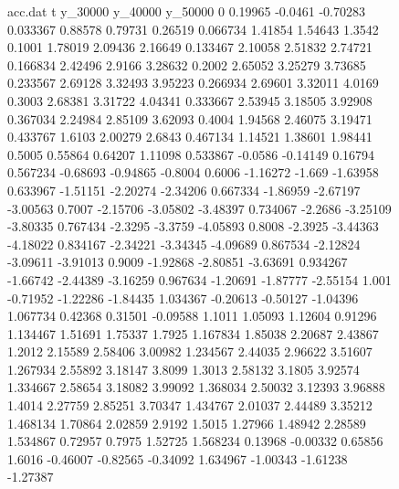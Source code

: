 \begin{figure}[H]
    \centering
        \begin{filecontents}{acc.dat}
                t	y_30000	y_40000	y_50000
                0	0.19965	-0.0461	-0.70283
                0.033367	0.88578	0.79731	0.26519
                0.066734	1.41854	1.54643	1.3542
                0.1001	1.78019	2.09436	2.16649
                0.133467	2.10058	2.51832	2.74721
                0.166834	2.42496	2.9166	3.28632
                0.2002	2.65052	3.25279	3.73685
                0.233567	2.69128	3.32493	3.95223
                0.266934	2.69601	3.32011	4.0169
                0.3003	2.68381	3.31722	4.04341
                0.333667	2.53945	3.18505	3.92908
                0.367034	2.24984	2.85109	3.62093
                0.4004	1.94568	2.46075	3.19471
                0.433767	1.6103	2.00279	2.6843
                0.467134	1.14521	1.38601	1.98441
                0.5005	0.55864	0.64207	1.11098
                0.533867	-0.0586	-0.14149	0.16794
                0.567234	-0.68693	-0.94865	-0.8004
                0.6006	-1.16272	-1.669	-1.63958
                0.633967	-1.51151	-2.20274	-2.34206
                0.667334	-1.86959	-2.67197	-3.00563
                0.7007	-2.15706	-3.05802	-3.48397
                0.734067	-2.2686	-3.25109	-3.80335
                0.767434	-2.3295	-3.3759	-4.05893
                0.8008	-2.3925	-3.44363	-4.18022
                0.834167	-2.34221	-3.34345	-4.09689
                0.867534	-2.12824	-3.09611	-3.91013
                0.9009	-1.92868	-2.80851	-3.63691
                0.934267	-1.66742	-2.44389	-3.16259
                0.967634	-1.20691	-1.87777	-2.55154
                1.001	-0.71952	-1.22286	-1.84435
                1.034367	-0.20613	-0.50127	-1.04396
                1.067734	0.42368	0.31501	-0.09588
                1.1011	1.05093	1.12604	0.91296
                1.134467	1.51691	1.75337	1.7925
                1.167834	1.85038	2.20687	2.43867
                1.2012	2.15589	2.58406	3.00982
                1.234567	2.44035	2.96622	3.51607
                1.267934	2.55892	3.18147	3.8099
                1.3013	2.58132	3.1805	3.92574
                1.334667	2.58654	3.18082	3.99092
                1.368034	2.50032	3.12393	3.96888
                1.4014	2.27759	2.85251	3.70347
                1.434767	2.01037	2.44489	3.35212
                1.468134	1.70864	2.02859	2.9192
                1.5015	1.27966	1.48942	2.28589
                1.534867	0.72957	0.7975	1.52725
                1.568234	0.13968	-0.00332	0.65856
                1.6016	-0.46007	-0.82565	-0.34092
                1.634967	-1.00343	-1.61238	-1.27387

\end{filecontents}
\end{figure}
